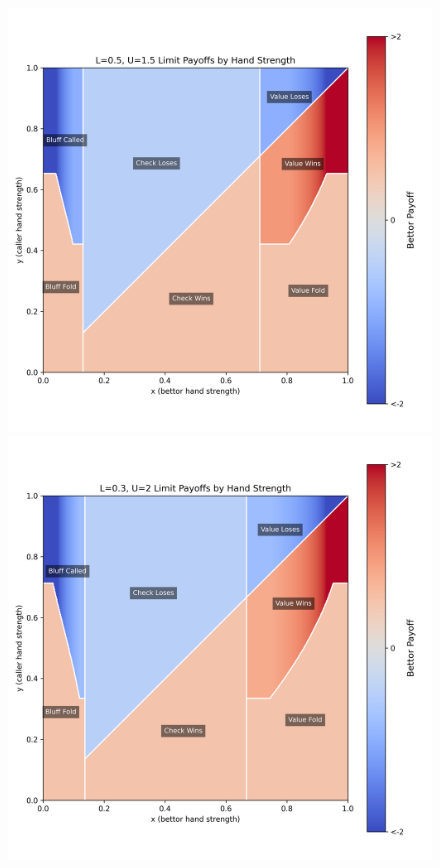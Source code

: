 \documentclass[a4paper,12pt]{article}
\theoremstyle{plain}
\theoremstyle{definition}
\begin{document}
\begin{figure}[h!]
\begin{adjustwidth}{-1in}{-1in}
\begin{minipage}{0.55\textwidth}
        \end{minipage}
        \vspace{0.5cm}\\
        \begin{minipage}{0.55\textwidth}
            \centering
            \includegraphics[width=\textwidth]{LU_payoffs_0.5_1.5.png}
        \end{minipage}
        \hspace{0.05\textwidth}
        \begin{minipage}{0.55\textwidth}
            \centering
            \includegraphics[width=\textwidth]{LU_payoffs_0.3_2.png}

\end{minipage}
\end{adjustwidth}
\end{figure}
\end{document}
